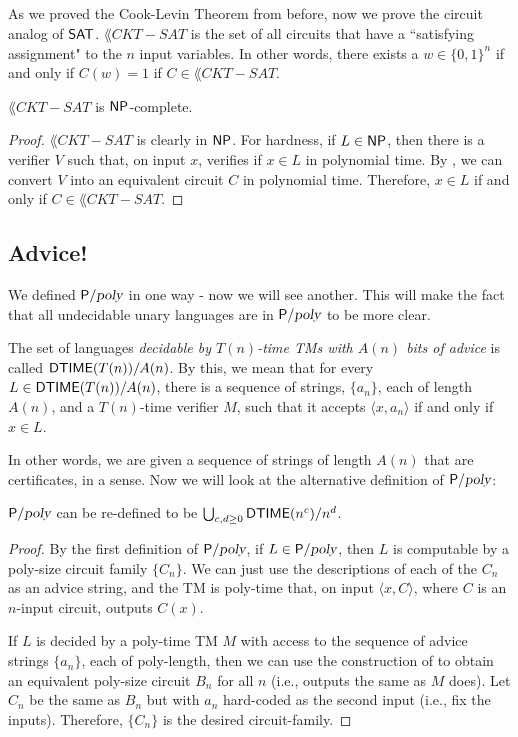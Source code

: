 \newcommand{\CKTSAT}{}
\subsection{\CKTSAT}
As we proved the Cook-Levin Theorem from before, now we prove the circuit analog of ${\mathsf{SAT}}$. $\CKTSAT$ is the set of all circuits that have a ``satisfying assignment" to the $n$ input variables. In other words, there exists a $w \in \{0, 1\}^n$ if and only if $C(w)=1$ if $C \in \CKTSAT$.

\begin{theorem}
$\CKTSAT$ is ${\mathsf{NP}}$-complete.
\end{theorem}

\begin{proof}
$\CKTSAT$ is clearly in ${\mathsf{NP}}$. For hardness, if $L \in {\ensuremath{\mathsf{NP}}}$, then there is a verifier $V$ such that, on input $x$, verifies if $x \in L$ in polynomial time. By , we can convert $V$ into an equivalent circuit $C$ in polynomial time. Therefore, $x \in L$ if and only if $C \in \CKTSAT$.
\end{proof}

\subsection{Advice!}
We defined ${\mathsf{P}}/{\textsl{poly}}$ in one way - now we will see another. This will make the fact that all undecidable unary languages are in ${\mathsf{P}}/{\textsl{poly}}$ to be more clear. 

\begin{definition}
The set of languages \emph{decidable by $T(n)$-time TMs with $A(n)$ bits of advice} is called ${\mathsf{DTIME}}(T(n))/A(n)$. By this, we mean that for every $L \in {\ensuremath{\mathsf{DTIME}}}(T(n))/A(n)$, there is a sequence of strings, $\{a_n\}$, each of length $A(n)$, and a $T(n)$-time verifier $M$, such that it accepts $\langle x, a_n \rangle$ if and only if $x \in L$.
\end{definition}

In other words, we are given a sequence of strings of length $A(n)$ that are certificates, in a sense. Now we will look at the alternative definition of ${\mathsf{P}}/{\textsl{poly}}$:
\begin{theorem}
${\mathsf{P}}/{\textsl{poly}}$ can be re-defined to be $\bigcup_{c, d \ge 0} {\mathsf{DTIME}}(n^c)/n^d$.
\end{theorem}

\begin{proof}
By the first definition of ${\mathsf{P}}/{\textsl{poly}}$, if $L \in {\ensuremath{\mathsf{P}}}/{\textsl{poly}}$, then $L$ is computable by a poly-size circuit family $\{C_n\}$. We can just use the descriptions of each of the $C_n$ as an advice string, and the TM is poly-time that, on input $\langle x, C \rangle$, where $C$ is an $n$-input circuit, outputs $C(x)$. 

\par If $L$ is decided by a poly-time TM $M$ with access to the sequence of advice strings $\{a_n\}$, each of poly-length, then we can use the construction of  to obtain an equivalent poly-size circuit $B_n$ for all $n$ (i.e., outputs the same as $M$ does). Let $C_n$ be the same as $B_n$ but with $a_n$ hard-coded as the second input (i.e., fix the inputs). Therefore, $\{C_n\}$ is the desired circuit-family.
\end{proof}